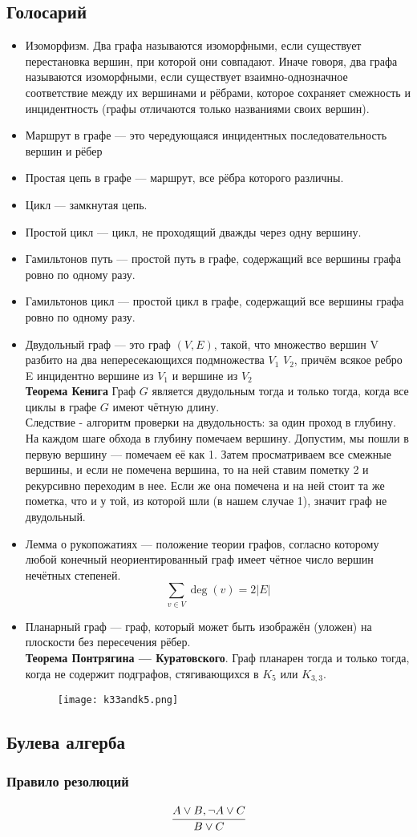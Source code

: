\subsection{Голосарий}
\begin{itemize}
	\item Изоморфизм. Два графа называются изоморфными, если существует перестановка вершин, при которой они совпадают. Иначе говоря, два графа называются изоморфными, если существует взаимно-однозначное соответствие между их вершинами и рёбрами, которое сохраняет смежность и инцидентность (графы отличаются только названиями своих вершин).
	\item Маршрут в графе — это чередующаяся инцидентных последовательность вершин и рёбер 
	\item Простая цепь в графе — маршрут, все рёбра которого различны. 
	\item Цикл — замкнутая цепь.
	\item Простой цикл — цикл, не проходящий дважды через одну вершину.
	\item Гамильтонов путь — простой путь в графе, содержащий все вершины графа ровно по одному разу.
	\item Гамильтонов цикл — простой цикл в графе, содержащий все вершины графа ровно по одному разу.

	\item Двудольный граф — это граф  $(V,E)$, такой, что множество вершин V разбито на два непересекающихся подмножества $V_{1}$ $V_{2}$, причём всякое ребро E инцидентно вершине из $V_{1}$ и вершине из $V_{2}$\\ \textbf{Теорема Кенига} Граф $G$ является двудольным тогда и только тогда, когда все циклы в графе $G$ имеют чётную длину. \\ Следствие - алгоритм проверки на двудольность:  за один проход в глубину. На каждом шаге обхода в глубину помечаем вершину. Допустим, мы пошли в первую вершину — помечаем её как 1. Затем просматриваем все смежные вершины, и если не помечена вершина, то на ней ставим пометку 2 и рекурсивно переходим в нее. Если же она помечена и на ней стоит та же пометка, что и у той, из которой шли (в нашем случае 1), значит граф не двудольный. 
	\item Лемма о рукопожатиях — положение теории графов, согласно которому любой конечный неориентированный граф имеет чётное число вершин нечётных степеней. $$\sum_{v\in V} \deg(v) = 2|E|$$
	\item Планарный граф — граф, который может быть изображён (уложен) на плоскости без пересечения рёбер. \\ \textbf{Теорема Понтрягина — Куратовского}. Граф планарен тогда и только тогда, когда не содержит подграфов, стягивающихся в $K_5$ или $K_{3,3}$.
	\begin{figure}[H]
    \centering
    \texttt{[image: k33andk5.png]}
	\end{figure}
\end{itemize}

\subsection{Булева алгерба}
\subsubsection{Правило резолюций}
\begin{equation}
	\cfrac{A \vee B, \neg A \vee C}{B \vee C}
\end{equation}

\clearpage